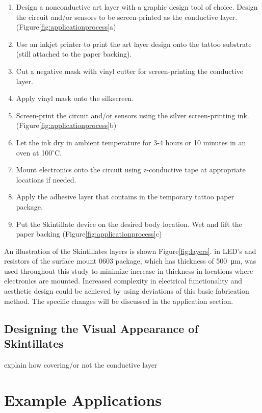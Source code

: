 \documentclass{sigchi}
\begin{document}
\begin{enumerate}
  \item Design a nonconductive art layer with a graphic design tool of choice. Design the circuit and/or sensors to be screen-printed as the conductive layer. (Figure\ref{fig:applicationprocess}a)
  \item Use an inkjet printer to print the art layer design onto the tattoo substrate (still attached to the paper backing). 
  \item Cut a negative mask with vinyl cutter for screen-printing the conductive layer. 
  \item Apply vinyl mask onto the silkscreen. 
  \item Screen-print the circuit and/or sensors using the silver screen-printing ink.(Figure\ref{fig:applicationprocess}b)
  \item Let the ink dry in ambient temperature for 3-4 hours or 10 minutes in an oven at 100$^{\circ}$C. 
  \item Mount electronics onto the circuit using z-conductive tape at appropriate locations if needed.   
  \item Apply the adhesive layer that contains in the temporary tattoo paper package. 
  \item Put the Skintillate device on the desired body location. Wet and lift the paper backing (Figure\ref{fig:applicationprocess}c)
\end{enumerate}
An illustration of the Skintillates layers is shown Figure\ref{fig:layers}. in LED's and resistors of the surface mount 0603 package, which has thickness of  \SI{500}{\micro\metre}, was used throughout this study to minimize increase in thickness in locations where electronics are mounted. Increased complexity in electrical functionality and aesthetic design could be achieved by using deviations of this basic fabrication method. The specific changes will be discussed in the application section. 

\subsection{Designing the Visual Appearance of Skintillates}
explain how covering/or not the conductive layer

\section{Example Applications}
\end{document}
